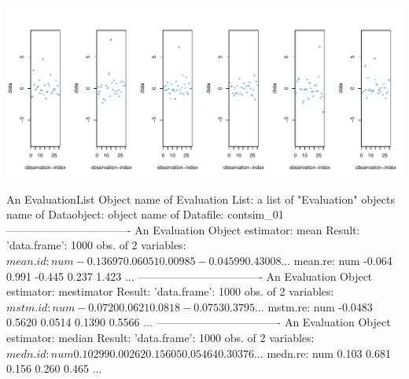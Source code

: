 \documentclass[11pt]{article}
\begin{document}
\includegraphics{distr-SimulateandEstimate}
\begin{Schunk}
\begin{Soutput}
An EvaluationList Object
name of Evaluation List: a list of "Evaluation" objects
name of Dataobject: object
name of Datafile: contsim_01
----------------------------------
An Evaluation Object
estimator: mean
Result: 'data.frame':	1000 obs. of  2 variables:
 $ mean.id: num  -0.13697  0.06051  0.00985 -0.04599  0.43008 ...
 $ mean.re: num  -0.064  0.991 -0.445  0.237  1.423 ...
----------------------------------
An Evaluation Object
estimator: mestimator
Result: 'data.frame':	1000 obs. of  2 variables:
 $ mstm.id: num  -0.0720  0.0621  0.0818 -0.0753  0.3795 ...
 $ mstm.re: num  -0.0483  0.5620  0.0514  0.1390  0.5566 ...
----------------------------------
An Evaluation Object
estimator: median
Result: 'data.frame':	1000 obs. of  2 variables:
 $ medn.id: num  0.10299 0.00262 0.15605 0.05464 0.30376 ...
 $ medn.re: num  0.103 0.681 0.156 0.260 0.465 ...

\end{Soutput}
\end{Schunk}
\end{document}
